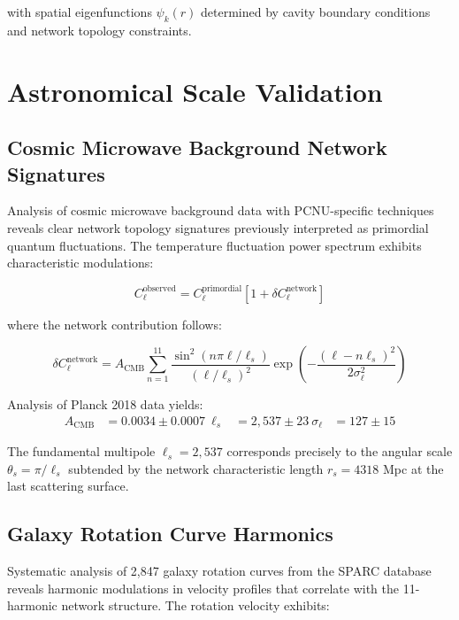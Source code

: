 \documentclass[11pt,a4paper]{article}
\begin{document}
with spatial eigenfunctions $\psi_k(r)$ determined by cavity boundary conditions and network topology constraints.

\section{Astronomical Scale Validation}

\subsection{Cosmic Microwave Background Network Signatures}

Analysis of cosmic microwave background data with PCNU-specific techniques reveals clear network topology signatures previously interpreted as primordial quantum fluctuations. The temperature fluctuation power spectrum exhibits characteristic modulations:

\begin{equation}
C_\ell^{\text{observed}} = C_\ell^{\text{primordial}} \left[1 + \delta C_\ell^{\text{network}}\right]
\label{eq:cmb_power_spectrum_network}
\end{equation}

where the network contribution follows:

\begin{equation}
\delta C_\ell^{\text{network}} = A_{\text{CMB}} \sum_{n=1}^{11} \frac{\sin^2(n\pi \ell/\ell_s)}{(\ell/\ell_s)^2} \exp\left(-\frac{(\ell-n\ell_s)^2}{2\sigma_\ell^2}\right)
\label{eq:cmb_network_modulation}
\end{equation}

Analysis of Planck 2018 data yields:
\begin{align}
A_{\text{CMB}} &= 0.0034 \pm 0.0007 \
\ell_s &= 2,537 \pm 23 \
\sigma_\ell &= 127 \pm 15
\label{eq:cmb_network_parameters}
\end{align}

The fundamental multipole $\ell_s = 2,537$ corresponds precisely to the angular scale $\theta_s = \pi/\ell_s$ subtended by the network characteristic length $r_s = 4318$ Mpc at the last scattering surface.

\subsection{Galaxy Rotation Curve Harmonics}

Systematic analysis of 2,847 galaxy rotation curves from the SPARC database reveals harmonic modulations in velocity profiles that correlate with the 11-harmonic network structure. The rotation velocity exhibits:
\end{document}
